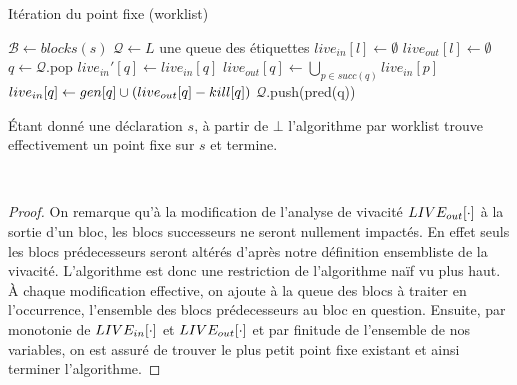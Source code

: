 \documentclass[a4paper, 12pt]{article}
\begin{document}
\begin{algorithm}[H]
	\caption{Itération du point fixe (worklist)}
	\begin{algorithmic}
		\State $\mathcal{B} \leftarrow blocks(s)$
		\State $\mathcal{Q} \leftarrow L$ une queue des étiquettes
		\State $live_{in}[l] \leftarrow \emptyset$
		\State $live_{out}[l] \leftarrow \emptyset$
		\EndFor
		\State $q \leftarrow \mathcal{Q}$.pop
		\State $live_{in}'[q] \leftarrow live_{in}[q]$
		\State $live_{out}[q] \leftarrow \bigcup\limits_{p\in succ(q)} live_{in}[p]$
		\State $live_{in}[q] \leftarrow gen[q] \cup (live_{out}[q] - kill[q])$
		\State $\mathcal{Q}$.push(pred(q))
		\EndIf
		\EndWhile
	\end{algorithmic}
\end{algorithm}
\noindent
\begin{lemma}
	Étant donné une déclaration $s$, à partir de $\bot$ l'algorithme par worklist trouve effectivement
	un point fixe sur $s$ et termine.
\end{lemma}
\\
\begin{proof}
On remarque qu'à la modification de l'analyse de vivacité $LIVE_{out}[\cdot]$ à la sortie d'un bloc,
les blocs successeurs ne seront nullement impactés. En effet seuls les blocs prédecesseurs seront
altérés d'après notre définition ensembliste de la vivacité. L'algorithme est donc une restriction de l'algorithme naïf vu plus
haut. À chaque modification effective, on ajoute à la queue des blocs à traiter en l'occurrence, l'ensemble des blocs
prédecesseurs au bloc en question. Ensuite, par monotonie de $LIVE_{in}[\cdot]$ et $LIVE_{out}[\cdot]$ et
par finitude de l'ensemble de nos variables, on est assuré de trouver le plus petit point fixe existant
et ainsi terminer l'algorithme.
\end{proof}
\end{document}

